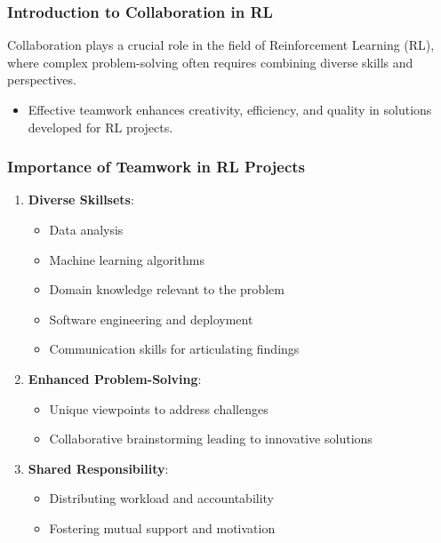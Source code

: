 \documentclass{beamer}
\begin{document}
\begin{frame}[fragile]
    \frametitle{Introduction to Collaboration in RL}
    Collaboration plays a crucial role in the field of Reinforcement Learning (RL), where complex problem-solving often requires combining diverse skills and perspectives. 
    \begin{itemize}
        \item Effective teamwork enhances creativity, efficiency, and quality in solutions developed for RL projects.
    \end{itemize}
\end{frame}

\begin{frame}[fragile]
    \frametitle{Importance of Teamwork in RL Projects}
    \begin{enumerate}
        \item \textbf{Diverse Skillsets}:
        \begin{itemize}
            \item Data analysis
            \item Machine learning algorithms
            \item Domain knowledge relevant to the problem
            \item Software engineering and deployment
            \item Communication skills for articulating findings
        \end{itemize}
        
        \item \textbf{Enhanced Problem-Solving}:
        \begin{itemize}
            \item Unique viewpoints to address challenges
            \item Collaborative brainstorming leading to innovative solutions
        \end{itemize}
        
        \item \textbf{Shared Responsibility}:
        \begin{itemize}
            \item Distributing workload and accountability
            \item Fostering mutual support and motivation
        \end{itemize}
    \end{enumerate}
\end{frame}
\end{document}
